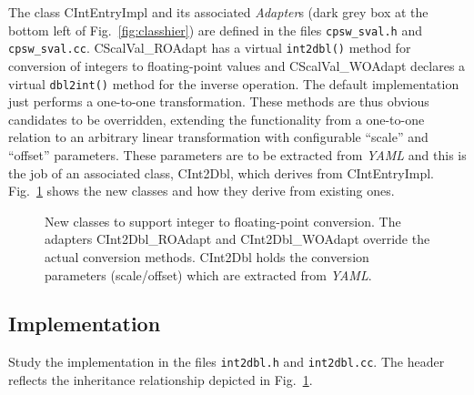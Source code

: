 \documentclass[10pt]{article}
\newcommand{\ita}[1]{\emph{#1}}
\newcommand{\yaml}      {\ita {YAML}}
\newcommand{\cod}[1] {{\tt#1}}
\newcounter{figs}
\newcommand{\fig}[2]{
\refstepcounter{figs}
\hspace*{\fill}\resizebox{#1}{!}{\texttt{[image: \#2]}}\hspace*{\fill}
}
\newcommand{\figr}[1]{Fig.~\ref{fig:#1}}
\begin{document}
The class CIntEntryImpl and its associated {\em Adapter}s (dark grey box
at the bottom left of \figr{classhier})
are defined in the files \cod{cpsw\_sval.h} and \cod{cpsw\_sval.cc}. CScalVal\_ROAdapt
has a virtual \cod{int2dbl()} method for conversion of integers to floating-point values and
CScalVal\_WOAdapt declares a virtual \cod{dbl2int()} method for the inverse operation.
The default implementation just performs a one-to-one transformation. These methods are
thus obvious candidates to be overridden, extending the functionality from a one-to-one
relation to an arbitrary linear transformation with configurable ``scale'' and
``offset'' parameters. These parameters are to be extracted from \yaml{} and this is
the job of an associated class, CInt2Dbl, which derives from CIntEntryImpl.
\figr{int2dbl} shows the new classes and how they derive from existing ones.

\begin{figure}[htb]
\fig{0.9\textwidth}{O.Common/int2dbl.pdf}
\label{fig:int2dbl}
\caption{New classes to support integer to floating-point conversion. The adapters
CInt2Dbl\_ROAdapt and CInt2Dbl\_WOAdapt override the actual conversion methods.
CInt2Dbl holds the conversion parameters (scale/offset) which are extracted
from \yaml{}.}
\end{figure}

\subsection{Implementation}
Study the implementation in the files \cod{int2dbl.h} and \cod{int2dbl.cc}.
The header reflects the inheritance relationship depicted in \figr{int2dbl}.
\end{document}
